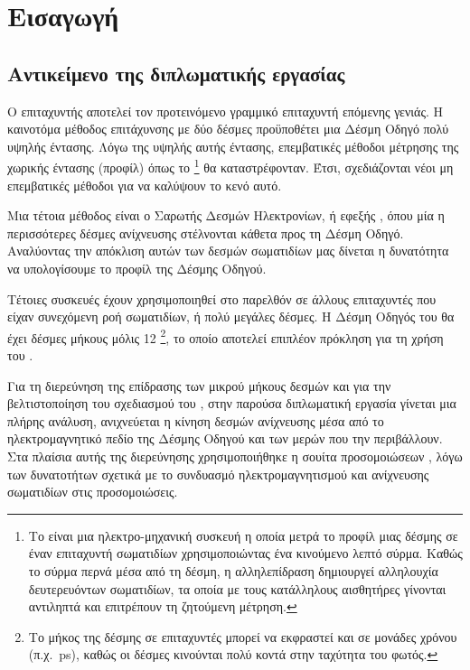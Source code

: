 \chapter{Εισαγωγή}


\epigraph{\textit{}}{}

\section{Αντικείμενο της διπλωματικής εργασίας}
Ο επιταχυντής  αποτελεί τον προτεινόμενο γραμμικό επιταχυντή επόμενης γενιάς.
Η καινοτόμα μέθοδος επιτάχυνσης με δύο δέσμες προϋποθέτει μια Δέσμη Οδηγό πολύ υψηλής έντασης.
Λόγω της υψηλής αυτής έντασης, επεμβατικές μέθοδοι μέτρησης της χωρικής έντασης (προφίλ) όπως το \footnote{Το  είναι μια ηλεκτρο-μηχανική συσκευή η οποία μετρά το προφίλ μιας δέσμης σε έναν επιταχυντή σωματιδίων χρησιμοποιώντας ένα κινούμενο λεπτό σύρμα.
Καθώς το σύρμα περνά μέσα από τη δέσμη, η αλληλεπίδραση δημιουργεί αλληλουχία δευτερευόντων σωματιδίων, τα οποία με τους κατάλληλους αισθητήρες γίνονται αντιληπτά και επιτρέπουν τη ζητούμενη μέτρηση.} θα καταστρέφονταν.
Έτσι, σχεδιάζονται νέοι μη επεμβατικές μέθοδοι για να καλύψουν το κενό αυτό.

Μια τέτοια μέθοδος είναι ο Σαρωτής Δεσμών Ηλεκτρονίων, ή εφεξής , όπου μία η περισσότερες δέσμες ανίχνευσης στέλνονται κάθετα προς τη Δέσμη Οδηγό.
Αναλύοντας την απόκλιση αυτών των δεσμών σωματιδίων μας δίνεται η δυνατότητα να υπολογίσουμε το προφίλ της Δέσμης Οδηγού.

Τέτοιες συσκευές έχουν χρησιμοποιηθεί στο παρελθόν σε άλλους επιταχυντές που είχαν συνεχόμενη ροή σωματιδίων, ή πολύ μεγάλες δέσμες.
Η Δέσμη Οδηγός του  θα έχει δέσμες μήκους μόλις 12 \footnote{Το μήκος της δέσμης σε επιταχυντές μπορεί να εκφραστεί και σε μονάδες χρόνου (π.χ.\ \si{\pico \second}), καθώς οι δέσμες κινούνται πολύ κοντά στην ταχύτητα του φωτός.}, το οποίο αποτελεί επιπλέον πρόκληση για τη χρήση του .

Για τη διερεύνηση της επίδρασης των μικρού μήκους δεσμών και για την βελτιστοποίηση του σχεδιασμού του , στην παρούσα διπλωματική εργασία γίνεται μια πλήρης ανάλυση,  ανιχνεύεται η κίνηση δεσμών ανίχνευσης μέσα από το ηλεκτρομαγνητικό πεδίο της Δέσμης Οδηγού και των μερών που την περιβάλλουν. 
Στα πλαίσια αυτής της διερεύνησης χρησιμοποιήθηκε η σουίτα προσομοιώσεων , λόγω των δυνατοτήτων σχετικά με το συνδυασμό ηλεκτρομαγνητισμού και ανίχνευσης σωματιδίων στις προσομοιώσεις.

